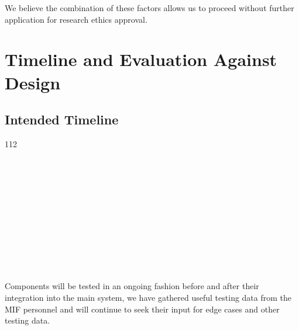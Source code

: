 \documentclass[a4paper, 12pt]{article}
\begin{document}
We believe the combination of these factors allows us to proceed without further application for research ethics approval.

\section{Timeline and Evaluation Against Design}
\subsection{Intended Timeline}
\begin{center}
	\hspace{-1.5cm}
	\begin{ganttchart}[ 
		hgrid, vgrid, 
		x unit=0.65cm, 
		y unit chart=0.6cm,
		link mid=0.5,
		bar label font=\footnotesize]{1}{12}
		 \\
		
		
		 \\
		 \\
		 \\
		 \\
		
		 \\
		
		 \\
		 \\
		 \\
		
		 \\
		
		 \\
		
	\end{ganttchart}
\end{center}

Components will be tested in an ongoing fashion before and after their integration into the main system, we have gathered useful testing data from the MIF personnel and will continue to seek their input for edge cases and other testing data.
\end{document}
